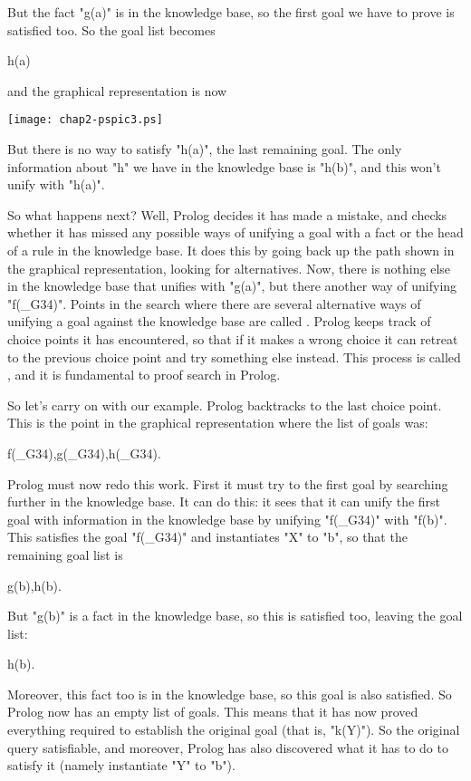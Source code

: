 But the fact "g(a)" is in the knowledge base, so the first goal we
have to prove is satisfied too. So the goal list becomes
\begin{LPNcodedisplay}
h(a)
\end{LPNcodedisplay}
%
and the graphical representation is now
%
\begin{center}
\texttt{[image: chap2-pspic3.ps]}
\end{center}
%
But there is no way to satisfy "h(a)", the last remaining goal.  The
only information about "h" we have in the knowledge base is "h(b)",
and this won't unify with "h(a)".

So what happens next? Well, Prolog decides it has made a mistake, and
checks whether it has missed any possible ways of unifying a goal with
a fact or the head of a rule in the knowledge base. It does this by
going back up the path shown in the graphical representation, looking
for alternatives. Now, there is nothing else in the knowledge base
that unifies with "g(a)", but there  another way of
unifying "f(_G34)".  Points in the search where there are several
alternative ways of unifying a goal against the knowledge base are
called .  Prolog keeps track of choice points it
has encountered, so that if it makes a wrong choice it can retreat to
the previous choice point and try something else instead. This process
is called , and it is fundamental to proof search
in Prolog.

So let's carry on with our example.
Prolog backtracks to the last choice point. This is the
point in the graphical representation where the list of goals was:
\begin{LPNcodedisplay}
f(_G34),g(_G34),h(_G34).
\end{LPNcodedisplay}
Prolog must now redo this work.  First it must try to
 the first goal  by searching further in the
knowledge base.  It can do this: it sees that it can unify the first
goal with information in the knowledge base by unifying "f(_G34)" with
"f(b)". This satisfies the goal "f(_G34)" and instantiates "X" to "b",
so that the remaining goal list is
\begin{LPNcodedisplay}
g(b),h(b).
\end{LPNcodedisplay}
But "g(b)" is a fact in the knowledge base, so this is satisfied too,
leaving the goal list:
\begin{LPNcodedisplay}
h(b).
\end{LPNcodedisplay}
Moreover, this fact too is in the knowledge base, so this goal is also
satisfied. So Prolog now has an empty list of goals.  This means that
it has now proved everything required to establish the original goal
(that is, "k(Y)"). So the original query  satisfiable, and
moreover, Prolog has also discovered what it has to do to satisfy it
(namely instantiate "Y" to "b").



